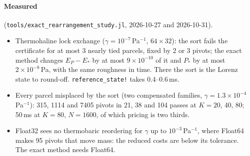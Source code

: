 \documentclass[11pt,a4paper]{article}
\newcommand{\code}[1]{\texttt{#1}}
\begin{document}
\paragraph{Measured} (\code{tools/exact\_rearrangement\_study.jl}, 2026-10-27 and 2026-10-31).
\begin{itemize}
  \item Thermohaline lock exchange ($\gamma=10^{-7}$\,Pa$^{-1}$, $64\times32$): the sort fails the certificate for at most 3
        nearly tied parcels, fixed by 2 or 3 pivots; the exact method changes $E_P-E_*$ by at most $9\times10^{-10}$ of it and
        $P_*$ by at most $2\times10^{-8}$\,Pa, with the same roughness in time. There the sort is the Lorenz state to
        round-off. \code{reference\_state!} takes 0.4--0.6\,ms.
  \item Every parcel misplaced by the sort (two compensated families, $\gamma=1.3\times10^{-4}$\,Pa$^{-1}$): 315, 1114 and
        7405 pivots in 21, 38 and 104 passes at $K=20$, 40, 80; 50\,ms at $K=80$, $N=1600$, of which pricing is two thirds.
  \item Float32 sees no thermobaric reordering for $\gamma$ up to $10^{-3}$\,Pa$^{-1}$, where Float64 makes 95 pivots that
        move mass: the reduced costs are below its tolerance. The exact method needs Float64.
\end{itemize}

\end{document}
